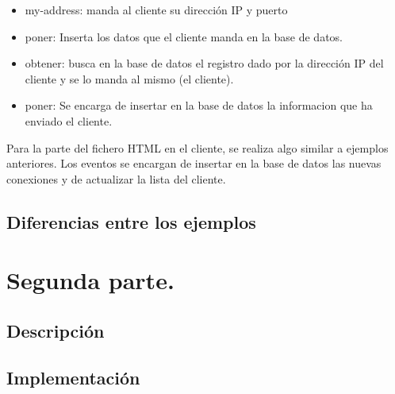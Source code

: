 \documentclass{article}
\begin{document}
\begin{itemize}
    \item my-address: manda al cliente su dirección IP y puerto
    \item poner: Inserta los datos que el cliente manda en la base de datos.
    \item obtener: busca en la base de datos el registro dado por la dirección IP del cliente y se lo manda al mismo (el cliente).
    \item poner: Se encarga de insertar en la base de datos la informacion que ha enviado el cliente.
\end{itemize}

Para la parte del fichero HTML en el cliente, se realiza algo similar a ejemplos anteriores. Los eventos se encargan de insertar en la base de datos las nuevas conexiones y de actualizar la lista del cliente.
\subsection{Diferencias entre los ejemplos}

\section{Segunda parte.}
\subsection{Descripción}
\subsection{Implementación}
\end{document}
